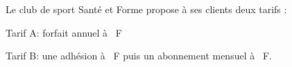 \documentclass[10pt]{article}
\begin{document}
\medskip

Le club de sport \og Santé et Forme \fg{} propose à ses clients deux
tarifs :

Tarif A: forfait annuel à ~F

Tarif B: une adhésion à ~F puis un abonnement mensuel à
~F.
%
%
%
%
%
%
%
%
%
%
%
%
\end{document}
